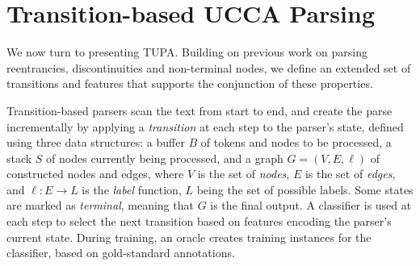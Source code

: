 \documentclass[11pt,a4paper]{article}
\newcommand{\parser}[1]{TUPA\textsubscript{#1}}
\begin{document}
\section{Transition-based UCCA Parsing}\label{sec:parser}

We now turn to presenting \parser{}.
Building on previous work on parsing reentrancies, discontinuities and non-terminal nodes,
we define an extended set of transitions and features that supports the conjunction of
these properties.

Transition-based parsers \cite{Nivre03anefficient} scan the text from start to end,
and create the parse incrementally by applying a \textit{transition}
at each step to the parser's state,
defined using three data structures: a buffer $B$ of tokens and nodes to be processed,
a stack $S$ of nodes currently being processed,
and a graph $G=(V,E,\ell)$ of constructed nodes and edges,
where $V$ is the set of \emph{nodes}, $E$ is the set of \emph{edges},
and $\ell : E \to L$ is the \emph{label} function, $L$ being the set of possible labels.
Some states are marked as \textit{terminal}, meaning that $G$ is the final output.
A classifier is used at each step to select the next transition based on features
encoding the parser's current state.
During training, an oracle creates training instances for the classifier,
based on gold-standard annotations.
\end{document}
